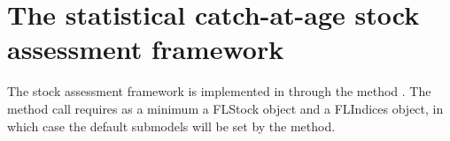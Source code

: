\documentclass[a4paper,english,11pt]{article}
\begin{document}
%
%
%
%
%
%
%
%
%
%
%
%
%
%
%
%
\section{The statistical catch-at-age stock assessment framework}\label{sec:sca}

The \aFa stock assessment framework is implemented in \R through the method . The method call requires as a minimum a FLStock object and a FLIndices object, in which case the default submodels will be set by the method.
\end{document}

